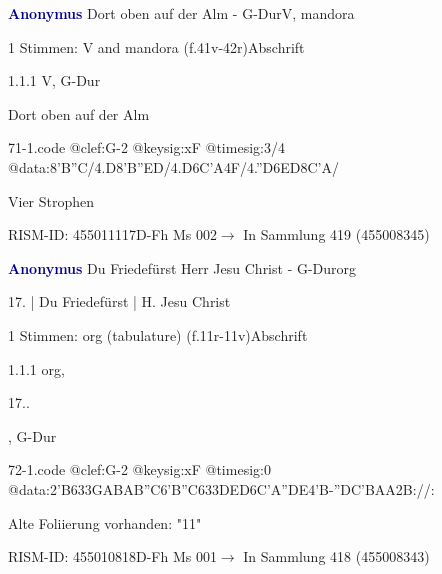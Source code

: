 \documentclass[twocolumn, 12pt]{book}
\begin{document}
\par \vspace{16pt} \textcolor{darkblue}{\textbf{Anonymus  }}\hfillplus{\textbf{[71]}}\newline Dort oben auf der Alm - G-Dur\newline V, mandora
\par \begin{itshape}\end{itshape} 
\par \textcolor{darkblue}{}  1 Stimmen: V and mandora  (f.41v-42r)\newline Abschrift
\par 1.1.1  V, G-Dur\newline \begin{footnotesize} Dort oben auf der Alm \end{footnotesize}  
\begin{filecontents*}{71-1.code}
@clef:G-2
@keysig:xF
@timesig:3/4
@data:{8'B''C}/4.D8'B''ED/4.D{6C'A}4F/4.''D{6ED}{8C'A}/
\end{filecontents*}
\newline %
\par Vier Strophen
\par RISM-ID: 455011117\newline D-Fh  Ms 002\newline $\rightarrow$ In Sammlung 419 (455008345)
      
\par \vspace{16pt} \textcolor{darkblue}{\textbf{Anonymus  }}\hfillplus{\textbf{[72]}}\newline Du Friedefürst Herr Jesu Christ - G-Dur\newline org
\par \begin{itshape}[f.11r, at left:] 17. | Du Friedefürst | H. Jesu Christ\end{itshape} 
\par \textcolor{darkblue}{}  1 Stimmen: org (tabulature)  (f.11r-11v)\newline Abschrift
\par 1.1.1  org, \begin{itshape}17..\end{itshape}, G-Dur  
\begin{filecontents*}{72-1.code}
@clef:G-2
@keysig:xF
@timesig:0
@data:2'B{633GAB}{AB''C}{6'B''C}{633DED}{6C'A''DE}4'B-''DC'BAA2B://:
\end{filecontents*}
\newline %
\par Alte Foliierung vorhanden: "11"
\par RISM-ID: 455010818\newline D-Fh  Ms 001\newline $\rightarrow$ In Sammlung 418 (455008343)
      
\end{document}
